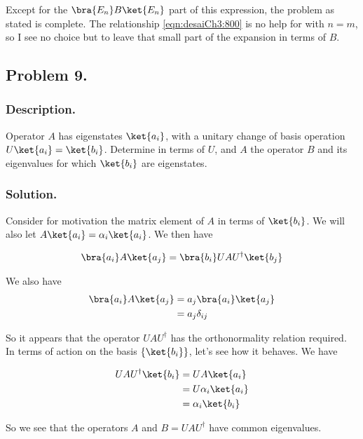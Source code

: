 Except for the $\bra{E_n} B \ket{E_n}$ part of this expression, the problem as stated is complete.  The relationship \ref{eqn:desaiCh3:800} is no help for with $n = m$, so I see no choice but to leave that small part of the expansion in terms of $B$.

\subsection{Problem 9. }
\subsubsection{Description. }

Operator $A$ has eigenstates $\ket{a_i}$, with a unitary change of basis operation $U \ket{a_i} = \ket{b_i}$.  Determine in terms of $U$, and $A$ the operator $B$ and its eigenvalues for which $\ket{b_i}$ are eigenstates.

\subsubsection{Solution. }

Consider for motivation the matrix element of $A$ in terms of $\ket{b_i}$.  We will also let $A \ket{a_i} = \alpha_i \ket{a_i}$.  We then have

\begin{align*}
\bra{a_i} A \ket{a_j}
&=
\bra{b_i} U A U^\dagger \ket{b_j} \\
\end{align*}

We also have
\begin{align*}
\bra{a_i} A \ket{a_j}
&=
a_j \bra{a_i} \ket{a_j} \\
&=
a_j \delta_{ij}
\end{align*}

So it appears that the operator $U A U^\dagger$ has the orthonormality relation required.  In terms of action on the basis $\{\ket{b_i}\}$, let's see how it behaves.  We have

\begin{align*}
U A U^\dagger \ket{b_i}
&= U A \ket{a_i} \\
&= U \alpha_i \ket{a_i} \\
&= \alpha_i \ket{b_i} \\
\end{align*}

So we see that the operators $A$ and $B = U A U^\dagger$ have common eigenvalues.


